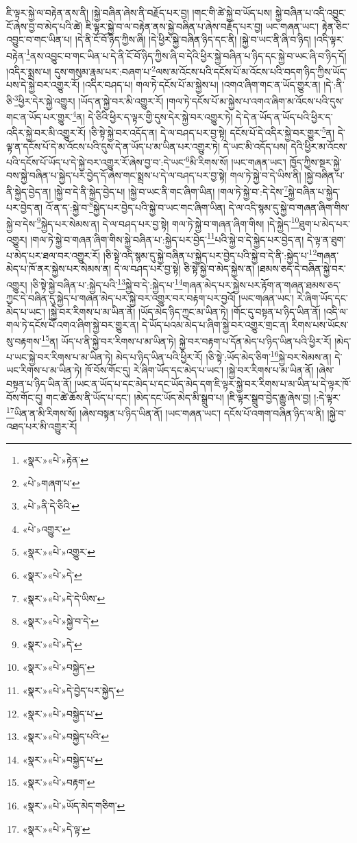 ཇི་ལྟར་སྐྱེ་ལ་བརྟེན་ནས་ནི། །སྐྱེ་བཞིན་ཞེས་ནི་བརྗོད་པར་བྱ། །གང་གི་ཚེ་སྐྱེ་བ་ཡོད་པས། སྐྱེ་བཞིན་པ་འདི་འབྱུང་ངོ་ཞེས་བྱ་བ་མེད་པའི་ཚེ། ཇི་ལྟར་སྐྱེ་བ་ལ་བརྟེན་ནས་སྐྱེ་བཞིན་པ་ཞེས་བརྗོད་པར་བྱ། ཡང་གཞན་ཡང་། རྟེན་ཅིང་འབྱུང་བ་གང་ཡིན་པ། །དེ་ནི་ངོ་བོ་ཉིད་ཀྱིས་ཞི། །དེ་ཕྱིར་སྐྱེ་བཞིན་ཉིད་དང་ནི། །སྐྱེ་བ་ཡང་ནི་ཞི་བ་ཉིད། །འདི་ལྟར་བརྟེན་\footnote{«སྣར་»«པེ་»རྟེན་}ནས་འབྱུང་བ་གང་ཡིན་པ་དེ་ནི་ངོ་བོ་ཉིད་ཀྱིས་ཞི་བ་དེའི་ཕྱིར་སྐྱེ་བཞིན་པ་ཉིད་དང་སྐྱེ་བ་ཡང་ཞི་བ་ཉིད་དོ། །འདིར་སྨྲས་པ། དུས་གསུམ་རྣམ་པར་:བཞག་པ་\footnote{«པེ་»གཞག་པ་}ལས་མ་འོངས་པའི་དངོས་པོ་མ་འོངས་པའི་བདག་ཉིད་ཀྱིས་ཡོད་པས་དེ་སྐྱེ་བར་འགྱུར་རོ། །འདིར་བཤད་པ། གལ་ཏེ་དངོས་པོ་མ་སྐྱེས་པ། །འགའ་ཞིག་གང་ན་ཡོད་གྱུར་ན། །དེ་:ནི་ཅི་\footnote{«པེ་»ནི་དེ་ཅིའི་}ཕྱིར་དེར་སྐྱེ་འགྱུར། །ཡོད་ན་སྐྱེ་བར་མི་འགྱུར་རོ། །གལ་ཏེ་དངོས་པོ་མ་སྐྱེས་པ་འགའ་ཞིག་མ་འོངས་པའི་དུས་གང་ན་ཡོད་པར་གྱུར་\footnote{«པེ་»འགྱུར་}ན། དེ་ཅིའི་ཕྱིར་ད་ལྟར་གྱི་དུས་དེར་སྐྱེ་བར་འགྱུར་ཏེ། དེ་དེ་ན་ཡོད་ན་ཡོད་པའི་ཕྱིར་ད་འདིར་སྐྱེ་བར་མི་འགྱུར་རོ། །ཅི་སྟེ་སྐྱེ་བར་འདོད་ན། དེ་ལ་བཤད་པར་བྱ་སྟེ། དངོས་པོ་དེ་འདིར་སྐྱེ་བར་གྱུར་\footnote{«སྣར་»«པེ་»འགྱུར་}ན། དེ་ལྟ་ན་དངོས་པོ་དེ་མ་འོངས་པའི་དུས་དེ་ན་ཡོད་པ་མ་ཡིན་པར་འགྱུར་ཏེ། དེ་ཡང་མི་འདོད་པས། དེའི་ཕྱིར་མ་འོངས་པའི་དངོས་པོ་ཡོད་པ་དེ་སྐྱེ་བར་འགྱུར་རོ་ཞེས་བྱ་བ་:དེ་ཡང་\footnote{«སྣར་»«པེ་»དེ་}མི་རིགས་སོ། །ཡང་གཞན་ཡང་། ཁྱོད་ཀྱིས་སྔར་སྐྱེ་བས་སྐྱེ་བཞིན་པ་སྐྱེད་པར་བྱེད་དོ་ཞེས་གང་སྨྲས་པ་དེ་ལ་བཤད་པར་བྱ་སྟེ། གལ་ཏེ་སྐྱེ་བ་དེ་ཡིས་ནི། །སྐྱེ་བཞིན་པ་ནི་སྐྱེད་བྱེད་ན། །སྐྱེ་བ་དེ་ནི་སྐྱེད་བྱེད་པ། །སྐྱེ་བ་ཡང་ནི་གང་ཞིག་ཡིན། །གལ་ཏེ་སྐྱེ་བ་:དེ་དེས་\footnote{«སྣར་»«པེ་»དེ་དེ་ཡིས་}སྐྱེ་བཞིན་པ་སྐྱེད་པར་བྱེད་ན། འོ་ན་ད་:སྐྱེ་བ་\footnote{«སྣར་»«པེ་»སྐྱེ་བ་དེ་}སྐྱེད་པར་བྱེད་པའི་སྐྱེ་བ་ཡང་གང་ཞིག་ཡིན། དེ་ལ་འདི་སྙམ་དུ་སྐྱེ་བ་གཞན་ཞིག་གིས་སྐྱེ་བ་དེས་\footnote{«སྣར་»«པེ་»དེ་}སྐྱེད་པར་སེམས་ན། དེ་ལ་བཤད་པར་བྱ་སྟེ། གལ་ཏེ་སྐྱེ་བ་གཞན་ཞིག་གིས། །དེ་སྐྱེད་\footnote{«སྣར་»«པེ་»བསྐྱེད་}ཐུག་པ་མེད་པར་འགྱུར། །གལ་ཏེ་སྐྱེ་བ་གཞན་ཞིག་གིས་སྐྱེ་བཞིན་པ་:སྐྱེད་པར་བྱེད་\footnote{«སྣར་»«པེ་»དེ་བྱེད་པར་སྐྱེད་}པའི་སྐྱེ་བ་དེ་སྐྱེད་པར་བྱེད་ན། དེ་ལྟ་ན་ཐུག་པ་མེད་པར་ཐལ་བར་འགྱུར་རོ། །ཅི་སྟེ་འདི་སྙམ་དུ་སྐྱེ་བཞིན་པ་སྐྱེད་པར་བྱེད་པའི་སྐྱེ་བ་དེ་ནི་:སྐྱེད་པ་\footnote{«སྣར་»«པེ་»བསྐྱེད་པ་}གཞན་མེད་པ་ཁོ་ནར་སྐྱེས་པར་སེམས་ན། དེ་ལ་བཤད་པར་བྱ་སྟེ། ཅི་སྟེ་སྐྱེ་བ་མེད་སྐྱེས་ན། །ཐམས་ཅད་དེ་བཞིན་སྐྱེ་བར་འགྱུར། །ཅི་སྟེ་སྐྱེ་བཞིན་པ་:སྐྱེད་པའི་\footnote{«སྣར་»«པེ་»བསྐྱེད་པའི་}སྐྱེ་བ་དེ་:སྐྱེད་པ་\footnote{«སྣར་»«པེ་»བསྐྱེད་པ་}གཞན་མེད་པར་སྐྱེས་པར་རྟོག་ན་གཞན་ཐམས་ཅད་ཀྱང་དེ་བཞིན་དུ་སྐྱེད་པ་གཞན་མེད་པར་སྐྱེ་བར་འགྱུར་བར་བརྟག་པར་བྱའོ། །ཡང་གཞན་ཡང་། རེ་ཞིག་ཡོད་དང་མེད་པ་ཡང་། །སྐྱེ་བར་རིགས་པ་མ་ཡིན་ནོ། །ཡོད་མེད་ཉིད་ཀྱང་མ་ཡིན་ཏེ། །གོང་དུ་བསྟན་པ་ཉིད་ཡིན་ནོ། །འདི་ལ་གལ་ཏེ་དངོས་པོ་འགའ་ཞིག་སྐྱེ་བར་གྱུར་ན། དེ་ཡོད་པའམ་མེད་པ་ཞིག་སྐྱེ་བར་འགྱུར་གྲང་ན། རིགས་པས་ཡོངས་སུ་བརྟགས་\footnote{«སྣར་»«པེ་»བརྟག་}ན། ཡོད་པ་ནི་སྐྱེ་བར་རིགས་པ་མ་ཡིན་ཏེ། སྐྱེ་བར་བརྟག་པ་དོན་མེད་པ་ཉིད་ཡིན་པའི་ཕྱིར་རོ། །མེད་པ་ཡང་སྐྱེ་བར་རིགས་པ་མ་ཡིན་ཏེ། མེད་པ་ཉིད་ཡིན་པའི་ཕྱིར་རོ། །ཅི་སྟེ་:ཡོད་མེད་ཅིག་\footnote{«སྣར་»«པེ་»ཡོད་མེད་གཅིག་}སྐྱེ་བར་སེམས་ན། དེ་ཡང་རིགས་པ་མ་ཡིན་ཏེ། ཁོ་བོས་གོང་དུ། རེ་ཞིག་ཡོད་དང་མེད་པ་ཡང་། །སྐྱེ་བར་རིགས་པ་མ་ཡིན་ནོ། །ཞེས་བསྟན་པ་ཉིད་ཡིན་ནོ། །ཡང་ན་ཡོད་པ་དང་མེད་པ་དང་ཡོད་མེད་དག་ཇི་ལྟར་སྐྱེ་བར་རིགས་པ་མ་ཡིན་པ་དེ་ལྟར་ཁོ་བོས་གོང་དུ། གང་ཚེ་ཆོས་ནི་ཡོད་པ་དང་། །མེད་དང་ཡོད་མེད་མི་སྒྲུབ་པ། །ཇི་ལྟར་སྒྲུབ་བྱེད་རྒྱུ་ཞེས་བྱ། །:དེ་ལྟར་\footnote{«སྣར་»«པེ་»དེ་ལྟ་}ཡིན་ན་མི་རིགས་སོ། །ཞེས་བསྟན་པ་ཉིད་ཡིན་ནོ། །ཡང་གཞན་ཡང་། དངོས་པོ་འགག་བཞིན་ཉིད་ལ་ནི། །སྐྱེ་བ་འཐད་པར་མི་འགྱུར་རོ། 
